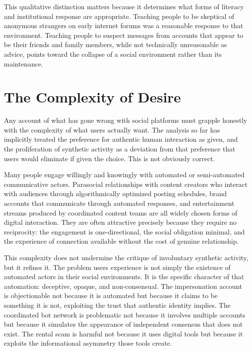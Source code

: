 \documentclass[12pt,a4paper]{article}
\begin{document}
This qualitative distinction matters because it determines what forms of literacy and institutional
response are appropriate. Teaching people to be skeptical of anonymous strangers on early internet
forums was a reasonable response to that environment. Teaching people to suspect messages from
accounts that appear to be their friends and family members, while not technically unreasonable
as advice, points toward the collapse of a social environment rather than its maintenance.

\section{The Complexity of Desire}

Any account of what has gone wrong with social platforms must grapple honestly with the complexity
of what users actually want. The analysis so far has implicitly treated the preference for authentic
human interaction as given, and the proliferation of synthetic activity as a deviation from that
preference that users would eliminate if given the choice. This is not obviously correct.

Many people engage willingly and knowingly with automated or semi-automated communicative actors.
Parasocial relationships with content creators who interact with audiences through algorithmically
optimized posting schedules, brand accounts that communicate through automated responses, and
entertainment streams produced by coordinated content teams are all widely chosen forms of digital
interaction. They are often attractive precisely because they require no reciprocity: the
engagement is one-directional, the social obligation minimal, and the experience of connection
available without the cost of genuine relationship.

This complexity does not undermine the critique of involuntary synthetic activity, but it refines
it. The problem users experience is not simply the existence of automated actors in their social
environments. It is the specific character of that automation: deceptive, opaque, and
non-consensual. The impersonation account is objectionable not because it is automated but
because it claims to be something it is not, exploiting the trust that authentic identity implies.
The coordinated bot network is problematic not because it involves multiple accounts but because
it simulates the appearance of independent consensus that does not exist. The rental scam is
harmful not because it uses digital tools but because it exploits the informational asymmetry
those tools create.
\end{document}
